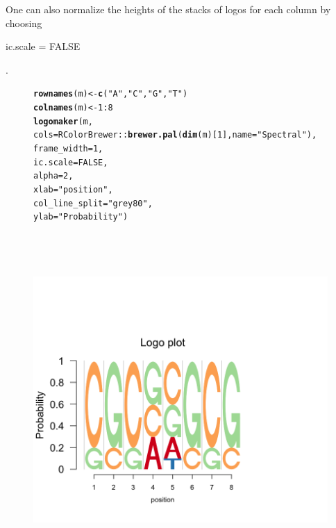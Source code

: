 \documentclass[12pt]{article}\usepackage[]{graphicx}\usepackage[usenames,dvipsnames]{color}
\makeatletter
\newcommand{\hlnum}[1]{\textcolor[rgb]{0.686,0.059,0.569}{#1}}%
\newcommand{\hlstr}[1]{\textcolor[rgb]{0.192,0.494,0.8}{#1}}%
\newcommand{\hlopt}[1]{\textcolor[rgb]{0,0,0}{#1}}%
\newcommand{\hlstd}[1]{\textcolor[rgb]{0.345,0.345,0.345}{#1}}%
\newcommand{\hlkwb}[1]{\textcolor[rgb]{0.69,0.353,0.396}{#1}}%
\newcommand{\hlkwc}[1]{\textcolor[rgb]{0.333,0.667,0.333}{#1}}%
\newcommand{\hlkwd}[1]{\textcolor[rgb]{0.737,0.353,0.396}{\textbf{#1}}}%
\newenvironment{kframe}{%
 \def\at@end@of@kframe{}%
 \ifinner\ifhmode%
  \def\at@end@of@kframe{\end{minipage}}%
  \begin{minipage}{\columnwidth}%
 \fi\fi%
 \def\FrameCommand##1{\hskip\@totalleftmargin \hskip-\fboxsep
 \colorbox{shadecolor}{##1}\hskip-\fboxsep
     \hskip-\linewidth \hskip-\@totalleftmargin \hskip\columnwidth}%
 \MakeFramed {\advance\hsize-\width
   \@totalleftmargin\z@ \linewidth\hsize
   \@setminipage}}%
 {\par\unskip\endMakeFramed%
 \at@end@of@kframe}
\newenvironment{knitrout}{}{} %
\makeatother
\begin{document}
\newpage

One can also normalize the  heights of the stacks of logos for each column by choosing \begin{verb} ic.scale = FALSE \end{verb}.

\begin{figure}[h]
\begin{center}
\begin{knitrout}
\color{fgcolor}\begin{kframe}
\begin{alltt}
\hlkwd{rownames}\hlstd{(m)} \hlkwb{<-} \hlkwd{c}\hlstd{(}\hlstr{"A"}\hlstd{,} \hlstr{"C"}\hlstd{,} \hlstr{"G"}\hlstd{,} \hlstr{"T"}\hlstd{)}
\hlkwd{colnames}\hlstd{(m)} \hlkwb{<-} \hlnum{1}\hlopt{:}\hlnum{8}
\hlkwd{logomaker}\hlstd{(m,}
          \hlkwc{cols}\hlstd{= RColorBrewer}\hlopt{::}\hlkwd{brewer.pal}\hlstd{(}\hlkwd{dim}\hlstd{(m)[}\hlnum{1}\hlstd{],}\hlkwc{name} \hlstd{=}\hlstr{"Spectral"}\hlstd{),}
          \hlkwc{frame_width} \hlstd{=} \hlnum{1}\hlstd{,}
          \hlkwc{ic.scale} \hlstd{=} \hlnum{FALSE}\hlstd{,}
          \hlkwc{alpha} \hlstd{=} \hlnum{2}\hlstd{,}
          \hlkwc{xlab}\hlstd{=}\hlstr{"position"}\hlstd{,}
          \hlkwc{col_line_split} \hlstd{=} \hlstr{"grey80"}\hlstd{,}
          \hlkwc{ylab} \hlstd{=} \hlstr{"Probability"}\hlstd{)}
\end{alltt}
\end{kframe}
\includegraphics[width=6in,height=5in]{figure/logolas_use_3-1} 

\end{knitrout}
\end{center}
\end{figure}
\end{document}
